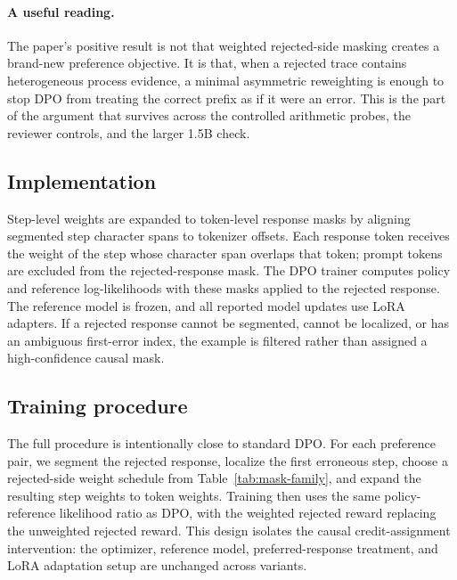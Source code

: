 \paragraph{A useful reading.}
The paper's positive result is not that weighted rejected-side masking creates a brand-new preference objective. It is that, when a rejected trace contains heterogeneous process evidence, a minimal asymmetric reweighting is enough to stop DPO from treating the correct prefix as if it were an error. This is the part of the argument that survives across the controlled arithmetic probes, the reviewer controls, and the larger 1.5B check.

\subsection{Implementation}

Step-level weights are expanded to token-level response masks by aligning segmented step character spans to tokenizer offsets. Each response token receives the weight of the step whose character span overlaps that token; prompt tokens are excluded from the rejected-response mask. The DPO trainer computes policy and reference log-likelihoods with these masks applied to the rejected response. The reference model is frozen, and all reported model updates use LoRA adapters. If a rejected response cannot be segmented, cannot be localized, or has an ambiguous first-error index, the example is filtered rather than assigned a high-confidence causal mask.

\subsection{Training procedure}

The full procedure is intentionally close to standard DPO. For each preference pair, we segment the rejected response, localize the first erroneous step, choose a rejected-side weight schedule from Table~\ref{tab:mask-family}, and expand the resulting step weights to token weights. Training then uses the same policy-reference likelihood ratio as DPO, with the weighted rejected reward replacing the unweighted rejected reward. This design isolates the causal credit-assignment intervention: the optimizer, reference model, preferred-response treatment, and LoRA adaptation setup are unchanged across variants.
